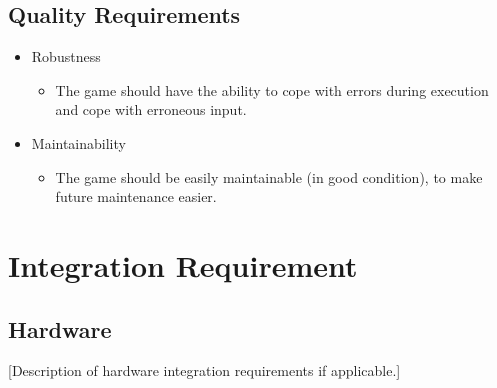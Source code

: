 \documentclass{article}
\begin{document}
   \subsection{Quality Requirements} 
   \begin{itemize}
    \item Robustness
		\begin{itemize}
			\item The game should have the ability to cope with errors during execution and cope with erroneous input.
	    		
	    \end{itemize}
	    
	    \item Maintainability
		\begin{itemize}
			\item The game should be easily maintainable (in good condition), to make future maintenance easier.
         \end{itemize}
        \end{itemize}
   
  \section{Integration Requirement}
    \subsection{Hardware}
    [Description of hardware integration requirements if applicable.]
\end{document}
